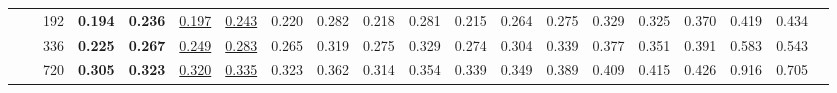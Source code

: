 \documentclass{article} \usepackage{iclr2024_conference,times}
\begin{document}
\begin{table}[ht]
{\begin{tabular}{cc|c|cc|cc|cc|cc|cc|cc|cc|ccc}
            &\multicolumn{1}{c|}{}& 192   & \textbf{0.194} & \textbf{0.236} & \uline{0.197} & \uline{0.243}                                                    & 0.220                                                    & 0.282 & 0.218                                                    & 0.281                                                         & 0.215                                                    & 0.264                                              & 0.275                                                     & 0.329                                                    & 0.325                                                     & 0.370                                                     & 0.419                                                    & 0.434                                                     \\
            &\multicolumn{1}{c|}{}& 336  & \textbf{0.225} & \textbf{0.267} & \uline{0.249} & \uline{0.283}                                                    & 0.265                                                    & 0.319 & 0.275                                                    & 0.329                                                      & 0.274                                                    & 0.304                                                 & 0.339                                                     & 0.377                                                    & 0.351                                                     & 0.391                                                     & 0.583                                                    & 0.543                                                    \\
            &\multicolumn{1}{c|}{}& 720   & \textbf{0.305} & \textbf{0.323} & \uline{0.320} & \uline{0.335} & 0.323                                                    & 0.362 & 0.314                                                    & 0.354                                                     & 0.339                                                    & 0.349                                                  & 0.389                                                     & 0.409                                                    & 0.415                                                     & 0.426                                                     & 0.916                                                    & 0.705                                                   \\
			\cline{2-19}

\end{tabular}}
\end{table}
\end{document}
